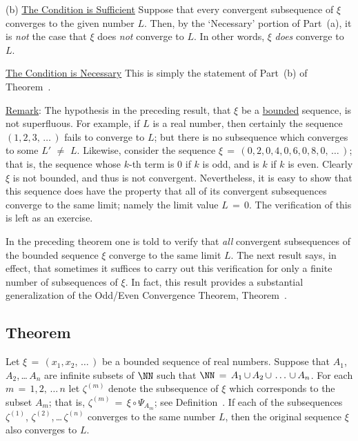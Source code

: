 {\V

        (b) \underline{The Condition is Sufficient} Suppose that every convergent subsequence of ${\xi}$ converges to the given number $L$.
    Then, by the `Necessary' portion of Part~(a), it is {\em not} the case that ${\xi}$ does {\em not} converge to $L$.
    In other words, ${\xi}$ {\em does} converge to $L$.

\underline{The Condition is Necessary} This is simply the statement of Part~(b) of Theorem~.

\V

        \underline{Remark}: The hypothesis in the preceding result, that ${\xi}$ be a \underline{bounded} sequence, is not superfluous.
    For example, if $L$ is a real number, then certainly the sequence $(1,2,3,\,{\ldots}\,)$ fails to converge to $L$;
    but there is no subsequence which converges to some $L' \,\,{\neq}\,\, L$.
    Likewise, consider the sequence ${\xi} \,=\, (0,2,0,4,0,6,0,8,0,\,{\ldots}\,)$; that is, the sequence whose $k$-th term is $0$ if $k$ is odd, and is $k$ if $k$ is even.
    Clearly ${\xi}$ is not bounded, and thus is not convergent.
    Nevertheless, it is easy to show that this sequence does have the property that all of its convergent subsequences converge to the same limit;
    namely the limit value $L \,=\, 0$. The verification of this is left as an exercise.

\V
\V

        In the preceding theorem one is told to verify that {\em all} convergent subsequences of the bounded sequence ${\xi}$ converge to the same limit $L$.
    The next result says, in effect, that sometimes it suffices to carry out this verification for only a finite number of subsequences of ${\xi}$.
    In fact, this result provides a substantial generalization of the Odd/Even Convergence Theorem, Theorem~.

\V

            \subsection{\small{\bf Theorem}}
            \label{ThmC30.30}

         Let ${\xi} \,=\, (x_{1},x_{2},\,{\ldots}\,)$ be a bounded sequence of real numbers.
    Suppose that $A_{1}$, $A_{2}$,\,{\ldots}\,$A_{n}$ are infinite subsets of ${\NN}$ such that ${\NN} \,=\, A_{1}\,{\cup}\,A_{2}\,{\cup}\,\,{\ldots}\,\,{\cup}\,A_{n}$.
    For each $m \,=\, 1,2,\,{\ldots}\,n$ let ${\zeta}^{(m)}$ denote the subsequence of ${\xi}$ which corresponds to the subset $A_{m}$;
    that is, ${\zeta}^{(m)} \,=\, {\xi}{\circ}{\Psi}_{A_{m}}$; see Definition~.
    If each of the subsequences ${\zeta}^{(1)}$, ${\zeta}^{(2)}$,\,{\ldots}\,${\zeta}^{(n)}$ converges to the same number $L$,
    then the original sequence ${\xi}$ also converges to $L$.

}
